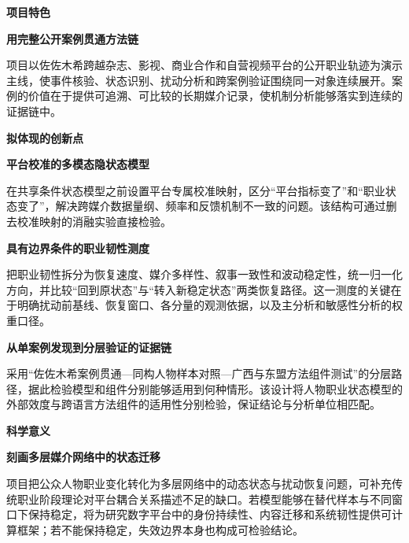 \GXNSFBodyText

\noindent\textbf{项目特色}\par

\noindent\textbf{用完整公开案例贯通方法链}\par
项目以佐佐木希跨越杂志、影视、商业合作和自营视频平台的公开职业轨迹为演示主线，使事件核验、状态识别、扰动分析和跨案例验证围绕同一对象连续展开。案例的价值在于提供可追溯、可比较的长期媒介记录，使机制分析能够落实到连续的证据链中。

\noindent\textbf{拟体现的创新点}\par

\noindent\textbf{平台校准的多模态隐状态模型}\par
在共享条件状态模型之前设置平台专属校准映射，区分“平台指标变了”和“职业状态变了”，解决跨媒介数据量纲、频率和反馈机制不一致的问题。该结构可通过删去校准映射的消融实验直接检验。

\noindent\textbf{具有边界条件的职业韧性测度}\par
把职业韧性拆分为恢复速度、媒介多样性、叙事一致性和波动稳定性，统一归一化方向，并比较“回到原状态”与“转入新稳定状态”两类恢复路径。这一测度的关键在于明确扰动前基线、恢复窗口、各分量的观测依据，以及主分析和敏感性分析的权重口径。

\noindent\textbf{从单案例发现到分层验证的证据链}\par
采用“佐佐木希案例贯通—同构人物样本对照—广西与东盟方法组件测试”的分层路径，据此检验模型和组件分别能够适用到何种情形。该设计将人物职业状态模型的外部效度与跨语言方法组件的适用性分别检验，保证结论与分析单位相匹配。

\noindent\textbf{科学意义}\par

\noindent\textbf{刻画多层媒介网络中的状态迁移}\par
项目把公众人物职业变化转化为多层网络中的动态状态与扰动恢复问题，可补充传统职业阶段理论对平台耦合关系描述不足的缺口。若模型能够在替代样本与不同窗口下保持稳定，将为研究数字平台中的身份持续性、内容迁移和系统韧性提供可计算框架；若不能保持稳定，失效边界本身也构成可检验结论。
